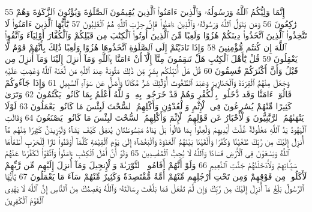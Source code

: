 {\tiny\colorbox{cl_aya}{55}} إِنَّمَا وَلِيُّكُمُ ٱللَّهُ وَرَسُولُهُۥ وَٱلَّذِينَ ءَامَنُوا۟ ٱلَّذِينَ يُقِيمُونَ ٱلصَّلَوٰةَ وَيُؤْتُونَ ٱلزَّكَوٰةَ وَهُمْ رَٰكِعُونَ
{\tiny\colorbox{cl_aya}{56}} وَمَن يَتَوَلَّ ٱللَّهَ وَرَسُولَهُۥ وَٱلَّذِينَ ءَامَنُوا۟ فَإِنَّ حِزْبَ ٱللَّهِ هُمُ ٱلْغَٰلِبُونَ
{\tiny\colorbox{cl_aya}{57}} يَٰٓأَيُّهَا ٱلَّذِينَ ءَامَنُوا۟ لَا تَتَّخِذُوا۟ ٱلَّذِينَ ٱتَّخَذُوا۟ دِينَكُمْ هُزُوًا وَلَعِبًا مِّنَ ٱلَّذِينَ أُوتُوا۟ ٱلْكِتَٰبَ مِن قَبْلِكُمْ وَٱلْكُفَّارَ أَوْلِيَآءَ وَٱتَّقُوا۟ ٱللَّهَ إِن كُنتُم مُّؤْمِنِينَ
{\tiny\colorbox{cl_aya}{58}} وَإِذَا نَادَيْتُمْ إِلَى ٱلصَّلَوٰةِ ٱتَّخَذُوهَا هُزُوًا وَلَعِبًا ذَٰلِكَ بِأَنَّهُمْ قَوْمٌ لَّا يَعْقِلُونَ
{\tiny\colorbox{cl_aya}{59}} قُلْ يَٰٓأَهْلَ ٱلْكِتَٰبِ هَلْ تَنقِمُونَ مِنَّآ إِلَّآ أَنْ ءَامَنَّا بِٱللَّهِ وَمَآ أُنزِلَ إِلَيْنَا وَمَآ أُنزِلَ مِن قَبْلُ وَأَنَّ أَكْثَرَكُمْ فَٰسِقُونَ
{\tiny\colorbox{cl_aya}{60}} قُلْ هَلْ أُنَبِّئُكُم بِشَرٍّ مِّن ذَٰلِكَ مَثُوبَةً عِندَ ٱللَّهِ مَن لَّعَنَهُ ٱللَّهُ وَغَضِبَ عَلَيْهِ وَجَعَلَ مِنْهُمُ ٱلْقِرَدَةَ وَٱلْخَنَازِيرَ وَعَبَدَ ٱلطَّٰغُوتَ أُو۟لَٰٓئِكَ شَرٌّ مَّكَانًا وَأَضَلُّ عَن سَوَآءِ ٱلسَّبِيلِ
{\tiny\colorbox{cl_aya}{61}} وَإِذَا جَآءُوكُمْ قَالُوٓا۟ ءَامَنَّا وَقَد دَّخَلُوا۟ بِٱلْكُفْرِ وَهُمْ قَدْ خَرَجُوا۟ بِهِۦ وَٱللَّهُ أَعْلَمُ بِمَا كَانُوا۟ يَكْتُمُونَ
{\tiny\colorbox{cl_aya}{62}} وَتَرَىٰ كَثِيرًا مِّنْهُمْ يُسَٰرِعُونَ فِى ٱلْإِثْمِ وَٱلْعُدْوَٰنِ وَأَكْلِهِمُ ٱلسُّحْتَ لَبِئْسَ مَا كَانُوا۟ يَعْمَلُونَ
{\tiny\colorbox{cl_aya}{63}} لَوْلَا يَنْهَىٰهُمُ ٱلرَّبَّٰنِيُّونَ وَٱلْأَحْبَارُ عَن قَوْلِهِمُ ٱلْإِثْمَ وَأَكْلِهِمُ ٱلسُّحْتَ لَبِئْسَ مَا كَانُوا۟ يَصْنَعُونَ
{\tiny\colorbox{cl_aya}{64}} وَقَالَتِ ٱلْيَهُودُ يَدُ ٱللَّهِ مَغْلُولَةٌ غُلَّتْ أَيْدِيهِمْ وَلُعِنُوا۟ بِمَا قَالُوا۟ بَلْ يَدَاهُ مَبْسُوطَتَانِ يُنفِقُ كَيْفَ يَشَآءُ وَلَيَزِيدَنَّ كَثِيرًا مِّنْهُم مَّآ أُنزِلَ إِلَيْكَ مِن رَّبِّكَ طُغْيَٰنًا وَكُفْرًا وَأَلْقَيْنَا بَيْنَهُمُ ٱلْعَدَٰوَةَ وَٱلْبَغْضَآءَ إِلَىٰ يَوْمِ ٱلْقِيَٰمَةِ كُلَّمَآ أَوْقَدُوا۟ نَارًا لِّلْحَرْبِ أَطْفَأَهَا ٱللَّهُ وَيَسْعَوْنَ فِى ٱلْأَرْضِ فَسَادًا وَٱللَّهُ لَا يُحِبُّ ٱلْمُفْسِدِينَ
{\tiny\colorbox{cl_aya}{65}} وَلَوْ أَنَّ أَهْلَ ٱلْكِتَٰبِ ءَامَنُوا۟ وَٱتَّقَوْا۟ لَكَفَّرْنَا عَنْهُمْ سَيِّـَٔاتِهِمْ وَلَأَدْخَلْنَٰهُمْ جَنَّٰتِ ٱلنَّعِيمِ
{\tiny\colorbox{cl_aya}{66}} وَلَوْ أَنَّهُمْ أَقَامُوا۟ ٱلتَّوْرَىٰةَ وَٱلْإِنجِيلَ وَمَآ أُنزِلَ إِلَيْهِم مِّن رَّبِّهِمْ لَأَكَلُوا۟ مِن فَوْقِهِمْ وَمِن تَحْتِ أَرْجُلِهِم مِّنْهُمْ أُمَّةٌ مُّقْتَصِدَةٌ وَكَثِيرٌ مِّنْهُمْ سَآءَ مَا يَعْمَلُونَ
{\tiny\colorbox{cl_aya}{67}} يَٰٓأَيُّهَا ٱلرَّسُولُ بَلِّغْ مَآ أُنزِلَ إِلَيْكَ مِن رَّبِّكَ وَإِن لَّمْ تَفْعَلْ فَمَا بَلَّغْتَ رِسَالَتَهُۥ وَٱللَّهُ يَعْصِمُكَ مِنَ ٱلنَّاسِ إِنَّ ٱللَّهَ لَا يَهْدِى ٱلْقَوْمَ ٱلْكَٰفِرِينَ
